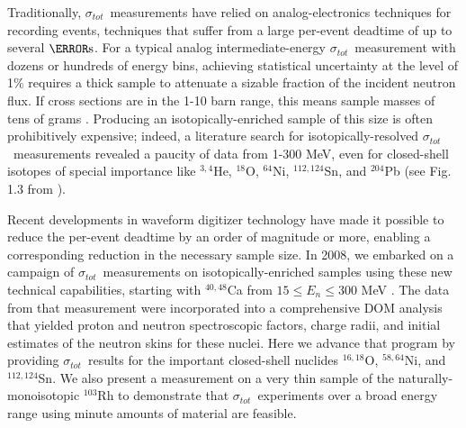\documentclass[twocolumn,secnumarabic,amssymb, nobibnotes, aps, prl,
superscriptaddress, nobalancelastpage, draft]{revtex4}
\newcommand{\tot}{\ensuremath{\sigma_{tot}}}
\newcommand{\oEight}{\ensuremath{^{18}}O}
\newcommand{\niFour}{\ensuremath{^{64}}N\lowercase{i}}
\newcommand{\snTwelveFour}{\ensuremath{^{112,124}}S\lowercase{n}}
\begin{document}
Traditionally, \tot\ measurements have relied on analog-electronics techniques for recording
events, techniques that suffer from a large per-event deadtime of
up to several $\micro\second$. For a typical analog intermediate-energy \tot\ measurement
with dozens or hundreds of energy bins, achieving statistical uncertainty at the
level of 1\% requires a thick sample to attenuate a sizable fraction of the
incident neutron flux. If cross sections are in the 1-10 barn range, this means
sample masses of tens of grams \cite{Finlay1993, Abfalterer2001}.
Producing an isotopically-enriched sample of this size is often
prohibitively expensive; indeed, a literature search for isotopically-resolved
\tot\ measurements revealed a paucity of data from 1-300 MeV, even for
closed-shell isotopes of special importance like $^{3,4}$He, \oEight, \niFour,
\snTwelveFour, and $^{204}$Pb (see Fig. 1.3 from \cite{PruittPhDThesis}).

Recent developments in waveform digitizer technology have made it
possible to reduce the per-event deadtime by an order of magnitude or more,
enabling a corresponding reduction in the necessary sample size. In 2008, we
embarked on a campaign of \tot\ measurements on isotopically-enriched samples
using these new technical capabilities,
starting with $^{40,48}$Ca from $15 \leq E_{n} \leq 300$ MeV \cite{Shane2010}.
The data from that measurement were incorporated into a comprehensive
DOM analysis \cite{Mueller2011, Mahzoon2014,
MahzoonPhDThesis} that yielded proton and neutron spectroscopic factors, charge
radii, and initial estimates of the neutron skins \cite{Mahzoon2017}
for these nuclei.
Here we advance that program by providing \tot\ results for
the important closed-shell nuclides
$^{16,18}$O, $^{58,64}$Ni, and $^{112,124}$Sn. We also present a measurement
on a very thin sample of the naturally-monoisotopic $^{103}$Rh to demonstrate that
\tot\ experiments over a broad energy range using minute amounts of material are feasible.
\end{document}
